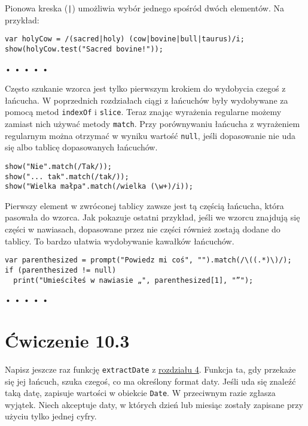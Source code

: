   
Pionowa kreska (\texttt{|}) umożliwia wybór jednego spośród dwóch elementów. Na przykład:

  
\begin{verbatim} 
var holyCow = /(sacred|holy) (cow|bovine|bull|taurus)/i;
show(holyCow.test("Sacred bovine!"));
 \end{verbatim}


\begin{center}
• • • • •
\end{center}

  
Często szukanie wzorca jest tylko pierwszym krokiem do wydobycia czegoś z łańcucha. W poprzednich rozdziałach ciągi z łańcuchów były wydobywane za pomocą metod \texttt{indexOf} i \texttt{slice}. Teraz znając wyrażenia regularne możemy zamiast nich używać metody \texttt{match}. Przy porównywaniu łańcucha z wyrażeniem regularnym można otrzymać w wyniku wartość \texttt{null}, jeśli dopasowanie nie uda się albo tablicę dopasowanych łańcuchów.

  
\begin{verbatim} 
show("Nie".match(/Tak/));
show("... tak".match(/tak/));
show("Wielka małpa".match(/wielka (\w+)/i));
 \end{verbatim}
  
Pierwszy element w zwróconej tablicy zawsze jest tą częścią łańcucha, która pasowała do wzorca. Jak pokazuje ostatni przykład, jeśli we wzorcu znajdują się części w nawiasach, dopasowane przez nie części również zostają dodane do tablicy. To bardzo ułatwia wydobywanie kawałków łańcuchów.

  
\begin{verbatim} 
var parenthesized = prompt("Powiedz mi coś", "").match(/\((.*)\)/);
if (parenthesized != null)
  print("Umieściłeś w nawiasie „", parenthesized[1], "”");
 \end{verbatim}


\begin{center}
• • • • •
\end{center}

  
\section*{Ćwiczenie 10.3}
\label{sec:10.3}
  
    
Napisz jeszcze raz funkcję \texttt{extractDate} z \hyperref[chap:4]{rozdziału 4}. Funkcja ta, gdy przekaże się jej łańcuch, szuka czegoś, co ma określony format daty. Jeśli uda się znaleźć taką datę, zapisuje wartości w obiekcie \texttt{Date}. W przeciwnym razie zgłasza wyjątek. Niech akceptuje daty, w których dzień lub miesiąc zostały zapisane przy użyciu tylko jednej cyfry.

